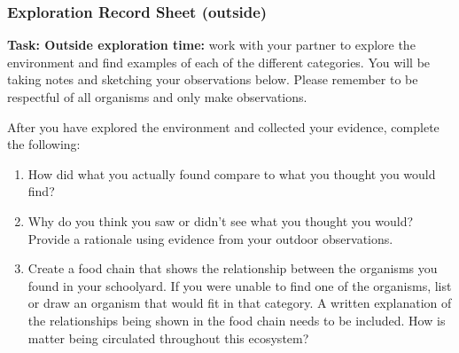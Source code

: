 \documentclass[11pt]{sig-alternate}
\begin{document}
\begin{large}
\subsubsection*{Exploration Record Sheet (outside)}
\textbf{Task: Outside exploration time:} work with your partner to explore the environment and find examples of each of the different categories. You will be taking notes and sketching your observations below. Please remember to be respectful of all organisms and only make observations.

\begin{table}[h!]
\end{table}

After you have explored the environment and collected your evidence, complete the following:
\begin{enumerate}
    \item How did what you actually found compare to what you thought you would find?
    \item Why do you think you saw or didn’t see what you thought you would? Provide a rationale using evidence from your outdoor observations. 
    \item Create a food chain that shows the relationship between the organisms you found in your schoolyard. If you were unable to find one of the organisms, list or draw an organism that would fit in that category. A written explanation of the relationships being shown in the food chain needs to be included. How is matter being circulated throughout this ecosystem?
\end{enumerate}


\end{large}
\end{document}
